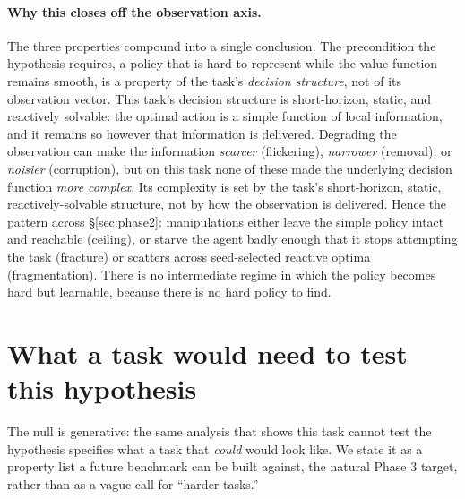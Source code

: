 \documentclass[10pt]{article}
\begin{document}
\paragraph{Why this closes off the observation axis.} The three properties compound into a
single conclusion. The precondition the hypothesis requires, a policy that is hard to
represent while the value function remains smooth, is a property of the task's \emph{decision
structure}, not of its observation vector. This task's decision structure is short-horizon,
static, and reactively solvable: the optimal action is a simple function of local
information, and it remains so however that information is delivered. Degrading the
observation can make the information \emph{scarcer} (flickering), \emph{narrower} (removal),
or \emph{noisier} (corruption), but on this task none of these made the underlying decision
function \emph{more complex}. Its complexity is set by the task's short-horizon, static,
reactively-solvable structure, not by how the observation is delivered. Hence the pattern
across \S\ref{sec:phase2}: manipulations either leave the simple policy intact and reachable
(ceiling), or starve the agent badly enough that it stops attempting the task (fracture) or
scatters across seed-selected reactive optima (fragmentation). There is no intermediate
regime in which the policy becomes hard but learnable, because there is no hard policy to
find.

\section{What a task would need to test this hypothesis}
\label{sec:need}

The null is generative: the same analysis that shows this task cannot test the hypothesis
specifies what a task that \emph{could} would look like. We state it as a property list a
future benchmark can be built against, the natural Phase 3 target, rather than as a vague
call for ``harder tasks.''
\end{document}
